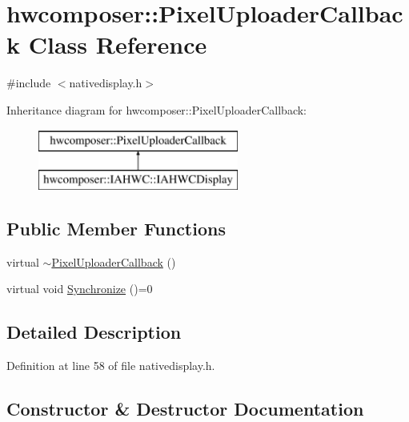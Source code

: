 \hypertarget{classhwcomposer_1_1PixelUploaderCallback}{}\section{hwcomposer\+:\+:Pixel\+Uploader\+Callback Class Reference}
\label{classhwcomposer_1_1PixelUploaderCallback}


{\ttfamily \#include $<$nativedisplay.\+h$>$}

Inheritance diagram for hwcomposer\+:\+:Pixel\+Uploader\+Callback\+:\begin{figure}[H]
\begin{center}
\leavevmode
\includegraphics[height=2.000000cm]{classhwcomposer_1_1PixelUploaderCallback}
\end{center}
\end{figure}
\subsection*{Public Member Functions}
\begin{DoxyCompactItemize}
\item 
virtual \mbox{\hyperlink{classhwcomposer_1_1PixelUploaderCallback_a85e3b7abfcba1c479ff6cb65dee7f543}{$\sim$\+Pixel\+Uploader\+Callback}} ()
\item 
virtual void \mbox{\hyperlink{classhwcomposer_1_1PixelUploaderCallback_aba7239332010fd18deb7152b1c4cecc3}{Synchronize}} ()=0
\end{DoxyCompactItemize}


\subsection{Detailed Description}


Definition at line 58 of file nativedisplay.\+h.



\subsection{Constructor \& Destructor Documentation}
\mbox{\label{classhwcomposer_1_1PixelUploaderCallback_a85e3b7abfcba1c479ff6cb65dee7f543}} 
